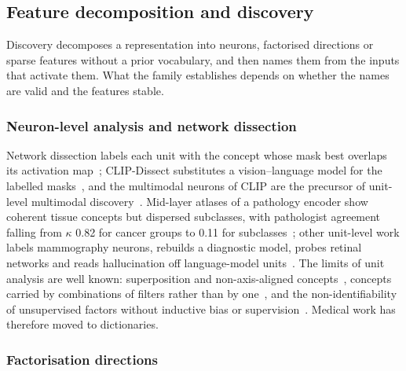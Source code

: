 \subsection{Feature decomposition and discovery}
\label{sec:discovery}

Discovery decomposes a representation into neurons, factorised directions or sparse features without a
prior vocabulary, and then names them from the inputs that activate them. What the family establishes
depends on whether the names are valid and the features stable.

\subsubsection{Neuron-level analysis and network dissection}

Network dissection labels each unit with the concept whose mask best overlaps its activation
map~\cite{bau2017network}; CLIP-Dissect substitutes a vision--language model for the labelled
masks~\cite{oikarinen2022clipdissect}, and the multimodal neurons of CLIP are the precursor of
unit-level multimodal discovery~\cite{goh2021multimodal}. Mid-layer atlases of a pathology encoder show
coherent tissue concepts but dispersed subclasses, with pathologist agreement falling from $\kappa$ 0.82
for cancer groups to 0.11 for subclasses~\cite{gustav2026class}; other unit-level work labels
mammography neurons, rebuilds a diagnostic model, probes retinal networks and reads hallucination off
language-model
units~\cite{salahuddin2025mammoclip,gong2025concepts,yousefzadeh2023lava,vankadaru2026readable}. The
limits of unit analysis are well known: superposition and non-axis-aligned
concepts~\cite{elhage2022toy,park2023linear}, concepts carried by combinations of filters rather than by
one~\cite{fong2018net2vec}, and the non-identifiability of unsupervised factors without inductive bias or
supervision~\cite{locatello2019challenging}. Medical work has therefore moved to dictionaries.

\subsubsection{Factorisation directions}

